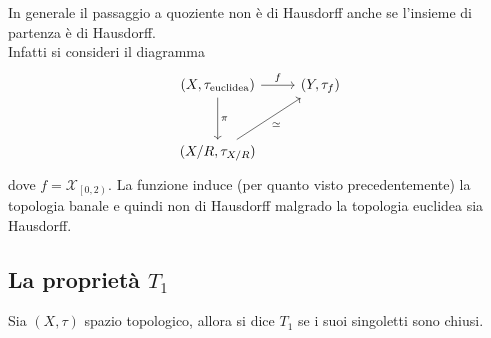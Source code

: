 \begin{remark}
	In generale il passaggio a quoziente non è di Hausdorff anche se l'insieme di partenza è di Hausdorff. \\ Infatti si consideri il diagramma 
	\begin{equation*}
	\begin{tikzcd}[row sep = 3em]
	 (X, \tau_{\text{euclidea}}) \arrow{d}{\pi}\arrow{r}{f} & (Y, \tau_f)\\
	(X/R,\tau_{X/R}) \arrow[swap]{ru}{\simeq} &
	\end{tikzcd}
	\end{equation*}
	dove $f = \mathcal{X}_{\left[0,2\right)}$. La funzione induce (per quanto visto precedentemente) la topologia banale e quindi non di Hausdorff malgrado la topologia euclidea sia Hausdorff. 
\end{remark} 



\subsection{\textcolor{TopGener}{\textbf{La proprietà $T_1$}}}



\begin{definition}
	Sia $(X, \tau)$ spazio topologico, allora si dice \textbf{$T_1$} se i suoi singoletti sono chiusi. 
\end{definition}

